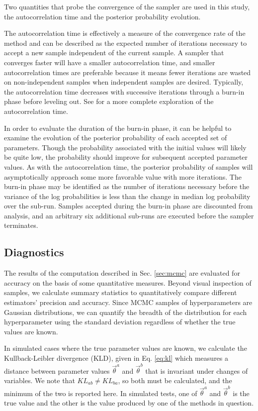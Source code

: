 \documentclass[preprint]{aastex}
\begin{document}
Two quantities that probe the convergence of the sampler are used in this 
study, the autocorrelation time and the posterior probability evolution.

The autocorrelation time is effectively a measure of the convergence rate of 
the method and can be described as the expected number of iterations necessary 
to accept a new sample independent of the current sample.  A sampler that 
converges faster will have a smaller autocorrelation time, and smaller 
autocorrelation times are preferable because it means fewer iterations are 
wasted on non-independent samples when independent samples are desired.  
Typically, the autocorrelation time decreases with successive iterations 
through a burn-in phase before leveling out.  See \citet{Foreman-Mackey2013} 
for a more complete exploration of the autocorrelation time.

In order to evaluate the duration of the burn-in phase, it can be helpful to 
examine the evolution of the posterior probability of each accepted set of 
parameters.  Though the probability associated with the initial values will 
likely be quite low, the probability should improve for subsequent accepted 
parameter values.  As with the autocorrelation time, the posterior probability 
of samples will asymptotically approach some more favorable value with more 
iterations.  The burn-in phase may be identified as the number of iterations 
necessary before the variance of the log probabilities is less than the change 
in median log probability over the sub-run.  Samples accepted during the 
burn-in phase are discounted from analysis, and an arbitrary six additional 
sub-runs are executed before the sampler terminates.  

\clearpage
\subsection{Diagnostics}
\label{sec:diag}

The results of the computation described in Sec. \ref{sec:mcmc} are evaluated 
for accuracy on the basis of some quantitative measures.  Beyond visual 
inspection of samples, we calculate summary statistics to quantitatively 
compare different estimators' precision and accuracy.  Since MCMC samples of 
hyperparameters are Gaussian distributions, we can quantify the breadth of the 
distribution for each hyperparameter using the standard deviation regardless of 
whether the true values are known.  

In simulated cases where the true parameter values are known, we calculate the 
Kullback-Leibler divergence (KLD), given in Eq. \ref{eq:kl} which measures a 
distance between parameter values $\vec{\theta}^{a}$ and $\vec{\theta}^{b}$ 
that is invariant under changes of variables.  We note that $KL_{ab}\neq 
KL_{ba}$, so both must be calculated, and the minimum of the two is reported 
here.  In simulated tests, one of $\vec{\theta}^{a}$ and $\vec{\theta}^{b}$ is 
the true value and the other is the value produced by one of the methods in 
question.  
\end{document}

